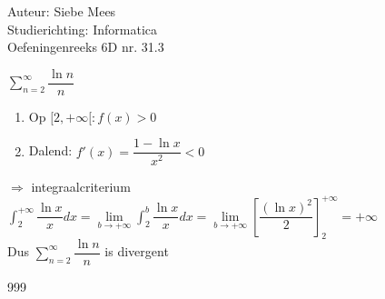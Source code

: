 \documentclass[a4paper]{article}
\begin{document}
  
\noindent \large Auteur: Siebe Mees \\
\noindent \large Studierichting: Informatica\\
\noindent \large Oefeningenreeks 6D nr. 31.3\\

\medskip

\normalsize

$ \displaystyle\sum_{n=2}^{\infty}\dfrac{\ln n}{n} $\\

\begin{enumerate}

\item Op $ [2,+\infty[ : f(x) > 0 $\\

\item Dalend: $ f'(x)=\dfrac{1-\ln x}{x^2}<0 $\\

\end{enumerate}

$ \Rightarrow $ integraalcriterium \\

$ \displaystyle\int_{2}^{+\infty}\dfrac{\ln x}{x}dx
=\lim\limits_{b \rightarrow +\infty}\displaystyle\int_{2}^{b}\dfrac{\ln x}{x}dx =\lim\limits_{b \rightarrow +\infty}\left[\dfrac{(\ln x)^2}{2}\right]_{2}^{+\infty} =+\infty $\\

Dus $ \displaystyle\sum_{n=2}^{\infty}\dfrac{\ln n}{n} $ is divergent \\

\begin{thebibliography}{999}
\end{thebibliography}
\end{document}
